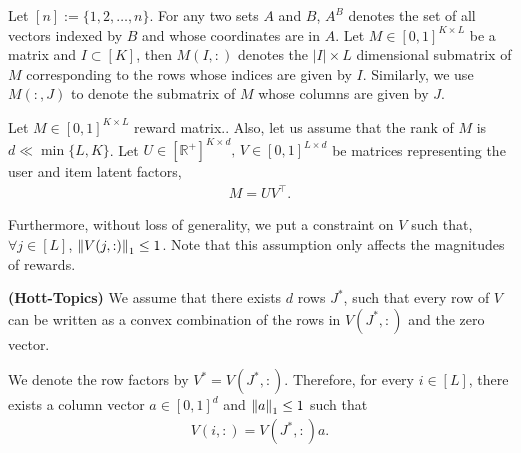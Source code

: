 
Let $[n] := \lbrace 1,2,\ldots, n\rbrace$. For any two sets $A$ and $B$, $A^B$ denotes the set of all vectors indexed by $B$ and whose coordinates are in $A$. Let $M\in [0,1]^{K\times L}$ be a matrix and $I \subset [K] $, then $M(I,:)$ denotes the $|I| \times L$ dimensional submatrix of $M$ corresponding to the rows whose indices are given by $I$. Similarly, we use $M(:,J)$ to denote the submatrix of $M$ whose columns are given by $J$.
	
	Let $M \in  [0,1]^{K \times L}$  reward matrix.. Also, let us assume that the rank of  $M$ is $d \ll \min\lbrace L,K\rbrace$. Let $ U \in [ \mathbb{R}^+ ]^{K\times d} \textbf{, } V \in  [0,1]^{L\times d}$ be matrices representing the user and item latent factors, 
\begin{align*}
	M = UV^{\intercal} .
\end{align*}	  
	
	
	Furthermore, without loss of generality, we put a constraint on $V$ such that, $\forall j\in [L]$, $ \left\lVert V(j,:)\right\rVert_1 \leq 1$. Note that this assumption only affects the magnitudes of rewards.
	
	
	
	
\begin{assumption}\textbf{(Hott-Topics)}
\label{assm:hott-topics}
We assume that there exists $d$ rows $J^*$,  such that every row of $V$ can be written as a convex combination of the rows in $V(J^*,:)$ and the zero vector. 
\end{assumption}
We denote the row factors by $V^* = V(J^*,:)$. Therefore, for every $i\in [L]$, there exists a column vector $a \in [0,1]^{d}$ and $ \left\lVert a\right\rVert_1 \leq 1$ such that 
\begin{align*}
V(i,:) = V(J^*,:) a.
\end{align*}




